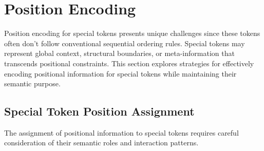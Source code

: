 
\section{Position Encoding}

Position encoding for special tokens presents unique challenges since these tokens often don't follow conventional sequential ordering rules. Special tokens may represent global context, structural boundaries, or meta-information that transcends positional constraints. This section explores strategies for effectively encoding positional information for special tokens while maintaining their semantic purpose.

\subsection{Special Token Position Assignment}

The assignment of positional information to special tokens requires careful consideration of their semantic roles and interaction patterns.

